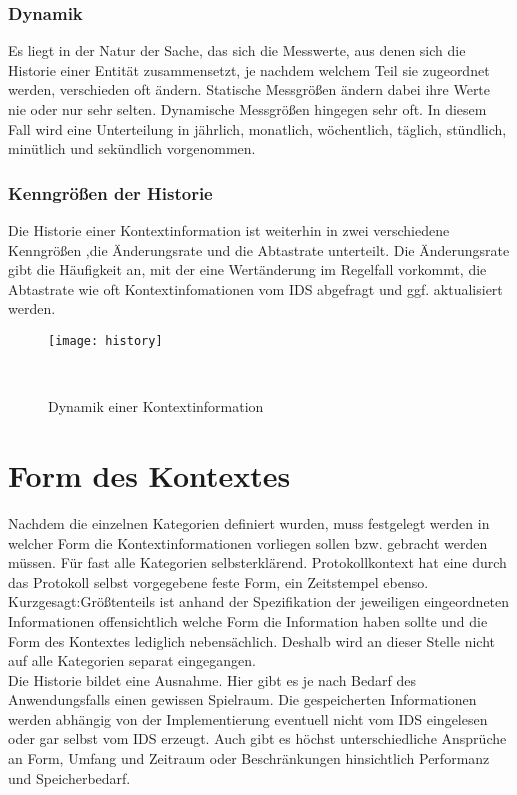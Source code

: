 \subsubsection{Dynamik}
\label{subsub:dyn}
Es liegt in der Natur der Sache, das sich die Messwerte, aus denen sich die Historie einer Entität zusammensetzt, je nachdem welchem Teil sie zugeordnet werden, verschieden oft ändern.
Statische Messgrößen ändern dabei ihre Werte nie oder nur sehr selten. Dynamische Messgrößen hingegen sehr oft. In diesem Fall wird eine Unterteilung in jährlich, monatlich, wöchentlich, täglich, stündlich, minütlich und sekündlich vorgenommen. 
\subsubsection{Kenngrößen der Historie}
\label{subsub:his_val}
Die Historie einer Kontextinformation ist weiterhin in zwei verschiedene Kenngrößen ,die Änderungsrate und die Abtastrate unterteilt. Die Änderungsrate gibt die Häufigkeit an, mit der eine Wertänderung im Regelfall vorkommt, die Abtastrate wie oft Kontextinfomationen vom IDS abgefragt und ggf. aktualisiert werden.
\begin{figure}[H]
\centering
\texttt{[image: history]}
\caption{Dynamik einer Kontextinformation}
\
\end{figure}
\section{Form des Kontextes}
Nachdem die einzelnen Kategorien definiert wurden, muss festgelegt werden in welcher Form die Kontextinformationen vorliegen sollen bzw. gebracht werden müssen. Für fast alle Kategorien selbsterklärend. Protokollkontext hat eine durch das Protokoll selbst vorgegebene feste Form, ein Zeitstempel ebenso. Kurzgesagt:Größtenteils ist anhand der Spezifikation der jeweiligen eingeordneten Informationen offensichtlich welche Form die Information haben sollte und die Form des Kontextes lediglich nebensächlich. Deshalb wird an dieser Stelle nicht auf alle Kategorien separat eingegangen.\\
Die Historie bildet eine Ausnahme. Hier gibt es je nach Bedarf des Anwendungsfalls einen gewissen Spielraum. Die gespeicherten Informationen werden abhängig von der Implementierung eventuell nicht vom IDS eingelesen oder gar selbst vom IDS erzeugt. Auch gibt es höchst unterschiedliche Ansprüche an Form, Umfang und Zeitraum oder Beschränkungen hinsichtlich Performanz und Speicherbedarf.
